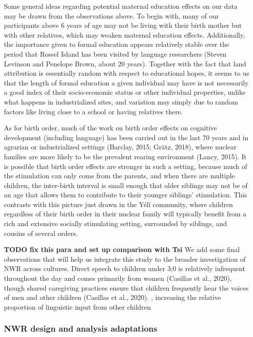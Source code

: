 \documentclass[english,,man,floatsintext]{apa6}
\begin{document}
Some general ideas regarding potential maternal education effects on our data may be drawn from the observations above. To begin with, many of our participants above 6 years of age may not be living with their birth mother but with other relatives, which may weaken maternal education effects. Additionally, the importance given to formal education appears relatively stable over the period that Rossel Island has been visited by language researchers (Steven Levinson and Penelope Brown, about 20 years). Together with the fact that land attribution is essentially random with respect to educational hopes, it seems to us that the length of formal education a given individual may have is not necessarily a good index of their socio-economic status or other individual properties, unlike what happens in industrialized sites, and variation may simply due to random factors like living close to a school or having relatives there.

As for birth order, much of the work on birth order effects on cognitive development (including language) has been carried out in the last 70 years and in agrarian or industrialized settings (Barclay, 2015; Grätz, 2018), where nuclear families are more likely to be the prevalent rearing environment (Lancy, 2015). It is possible that birth order effects are stronger in such a setting, because much of the stimulation can only come from the parents, and when there are multiple children, the inter-birth interval is small enough that older siblings may not be of an age that allows them to contribute to their younger siblings' stimulation. This contrasts with this picture just drawn in the Yélî community, where children regardless of their birth order in their nuclear family will typically benefit from a rich and extensive socially stimulating setting, surrounded by siblings, and cousins of several orders.

\textbf{TODO fix this para and set up comparison with Tsi} We add some final observations that will help us integrate this study to the broader investigation of NWR across cultures. Direct speech to children under 3;0 is relatively infrequent throughout the day and comes primarily from women (Casillas et al., 2020), though shared caregiving practices ensure that children frequently hear the voices of men and other children (Casillas et al., 2020). , increasing the relative proportion of linguistic input from other children

\hypertarget{nwr-design-and-analysis-adaptations}{%
\subsubsection{NWR design and analysis adaptations}\label{nwr-design-and-analysis-adaptations}}
\end{document}
